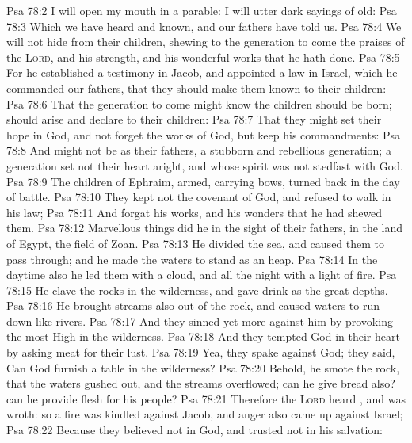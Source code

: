 \vs Psa 78:2 I will open my mouth in a parable: I will utter dark sayings of old:
\vs Psa 78:3 Which we have heard and known, and our fathers have told us.
\vs Psa 78:4 We will not hide  from their children, shewing to the generation to come the praises of the \textsc{Lord}, and his strength, and his wonderful works that he hath done.
\vs Psa 78:5 For he established a testimony in Jacob, and appointed a law in Israel, which he commanded our fathers, that they should make them known to their children:
\vs Psa 78:6 That the generation to come might know  the children  should be born;  should arise and declare  to their children:
\vs Psa 78:7 That they might set their hope in God, and not forget the works of God, but keep his commandments:
\vs Psa 78:8 And might not be as their fathers, a stubborn and rebellious generation; a generation  set not their heart aright, and whose spirit was not stedfast with God.
\vs Psa 78:9 The children of Ephraim,  armed,  carrying bows, turned back in the day of battle.
\vs Psa 78:10 They kept not the covenant of God, and refused to walk in his law;
\vs Psa 78:11 And forgat his works, and his wonders that he had shewed them.
\vs Psa 78:12 Marvellous things did he in the sight of their fathers, in the land of Egypt,  the field of Zoan.
\vs Psa 78:13 He divided the sea, and caused them to pass through; and he made the waters to stand as an heap.
\vs Psa 78:14 In the daytime also he led them with a cloud, and all the night with a light of fire.
\vs Psa 78:15 He clave the rocks in the wilderness, and gave  drink as  the great depths.
\vs Psa 78:16 He brought streams also out of the rock, and caused waters to run down like rivers.
\vs Psa 78:17 And they sinned yet more against him by provoking the most High in the wilderness.
\vs Psa 78:18 And they tempted God in their heart by asking meat for their lust.
\vs Psa 78:19 Yea, they spake against God; they said, Can God furnish a table in the wilderness?
\vs Psa 78:20 Behold, he smote the rock, that the waters gushed out, and the streams overflowed; can he give bread also? can he provide flesh for his people?
\vs Psa 78:21 Therefore the \textsc{Lord} heard , and was wroth: so a fire was kindled against Jacob, and anger also came up against Israel;
\vs Psa 78:22 Because they believed not in God, and trusted not in his salvation:
